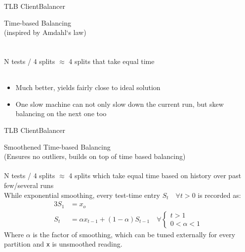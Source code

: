 \documentclass{beamer}
\begin{document}
\begin{frame}{TLB Client}{Balancer}
  \begin{center}
    {\large Time-based Balancing}\\
    {\tiny (inspired by Amdahl`s law)}\\
    \quad\\
    \quad\\
    N tests / 4 splits $\approx$ 4 splits that take equal time
    \quad\\
    \quad\\
    \begin{itemize}
    \item Much better, yields fairly close to ideal solution
    \item One slow machine can not only slow down the current run, but skew balancing on the next one too
    \end{itemize}
  \end{center}
\end{frame}

\begin{frame}{TLB Client}{Balancer}
  \begin{center}
    {\large Smoothened Time-based Balancing}\\
    {\tiny (Ensures no outliers, builds on top of time based balancing)}\\
    \quad\\
    {\small N tests / 4 splits $\approx$ 4 splits which take equal time based on history over past few/several runs \\
    While exponential smoothing, every test-time entry $ S_t \quad \forall t > 0 $ is recorded as:}
    \begin{alignat}{3}
      S_1 & = x_o\\
      S_t & = \alpha x_{t-1} + (1 - \alpha)S_{t-1} \quad
      \forall 
      \begin{cases}
        t > 1\\ 
        0 < \alpha < 1
      \end{cases}
    \end{alignat}
    {\tiny Where $\alpha$ is the factor of smoothing, which can be tuned externally for every partition and \texttt{x} is unsmoothed reading.}
  \end{center}
\end{frame}
\end{document}
